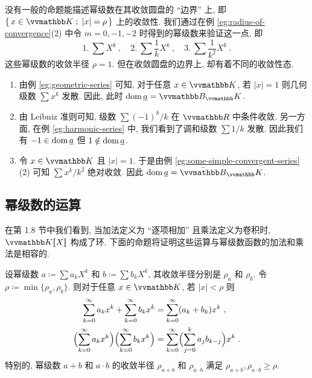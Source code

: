 \begin{remark}\label{rem:boundary-of-disk-of-convergence}
    没有一般的命题能描述幂级数在其收敛圆盘的 ``边界'' 上, 即 \(\{\, x \in \K \;;\; |x| = \rho \,\}\) 上的收敛性. 我们通过在例 \ref{eg:radius-of-convergence}(2) 中令 \(m = 0, - 1, - 2\) 时得到的幂级数来验证这一点, 即
    \[
        1.\ \sum X^k\ ,\quad 2.\ \sum \frac{1}{k} X^k\ ,\quad 3.\ \sum \frac{1}{k^2} X^k\ .
    \]
    这些幂级数的收敛半径 \(\rho = 1\). 但在收敛圆盘的边界上, 却有着不同的收敛性态.
    \begin{enumerate}
        \item 由例 \ref{eg:geometric-series} 可知, 对于任意 \(x \in \K\), 若 \(|x| = 1\) 则几何级数 \(\sum x^k\) 发散. 因此, 此时 \(\dom \underline a = \B_\K\).
        \item 由 Leibniz 准则可知, 级数 \(\sum (- 1)^k / k\) 在 \(\R\) 中条件收敛. 另一方面, 在例 \ref{eg:harmonic-series} 中, 我们看到了调和级数 \(\sum 1 / k\) 发散. 因此我们有 \(- 1 \in \operatorname{dom} \underline a\) 但 \(1 \notin \operatorname{dom} \underline a\).
        \item 令 \(x \in \K\) 且 \(|x| = 1\). 于是由例 \ref{eg:some-simple-convergent-series}(2) 可知 \(\sum x^k / k^2\) 绝对收敛. 因此 \(\dom \underline a = \bar \B_\K\).
    \end{enumerate}
\end{remark}

\subsection{幂级数的运算}

在第 1.8 节中我们看到, 当加法定义为 ``逐项相加'' 且乘法定义为卷积时, \(\K[\![X]\!]\) 构成了环. 下面的命题将证明这些运算与幂级数函数的加法和乘法是相容的.

\begin{proposition}\label{prop:calculating-with-power-series}
    设幂级数 \(a \coloneqq \sum a_k X^k\) 和 \(b \coloneqq \sum b_k X^k\), 其收敛半径分别是 \(\rho_a\) 和 \(\rho_b\). 令 \(\rho \coloneqq \min\{\rho_a, \rho_b\}\). 则对于任意 \(x \in \K\), 若 \(|x| < \rho\) 则
    \begin{align*}
        \sum_{k = 0}^\infty a_k x^k + \sum_{k = 0}^\infty b_k x^k &= \sum_{k = 0}^\infty (a_k + b_k) x^k\ , \\
        \Bigl(\sum_{k = 0}^\infty a_k x^k\Bigr) \Bigl(\sum_{k = 0}^\infty b_k x^k\Bigr) &= \sum_{k = 0}^\infty \Bigl(\sum_{j = 0}^k a_j b_{k - j}\Bigr) x^k\ .
    \end{align*}
    特别的, 幂级数 \(a + b\) 和 \(a \cdot b\) 的收敛半径 \(\rho_{a + b}\) 和 \(\rho_{a \cdot b}\) 满足 \(\rho_{a + b}, \rho_{a \cdot b} \geq \rho\).
\end{proposition}

